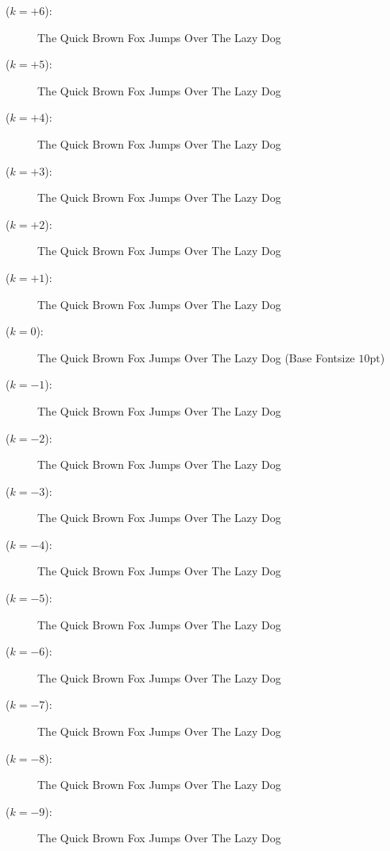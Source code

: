 \documentclass[paper=a4, fontsize=9]{habshe-tufte}
\begin{document}
\begin{description}
\item[\texttt{\string\HUGE} ($k=+6$):] {\HUGE The Quick Brown Fox Jumps Over The Lazy Dog}
\item[\texttt{\string\Huge} ($k=+5$):] {\Huge The Quick Brown Fox Jumps Over The Lazy Dog}
\item[\texttt{\string\huge} ($k=+4$):] {\huge The Quick Brown Fox Jumps Over The Lazy Dog}
\item[\texttt{\string\LARGE} ($k=+3$):] {\LARGE The Quick Brown Fox Jumps Over The Lazy Dog}
\item[\texttt{\string\Large} ($k=+2$):] {\Large The Quick Brown Fox Jumps Over The Lazy Dog}
\item[\texttt{\string\large} ($k=+1$):] {\large The Quick Brown Fox Jumps Over The Lazy Dog}
\item[\texttt{\string\regular} ($k=0$):] {\regular The Quick Brown Fox Jumps Over The Lazy Dog (Base Fontsize $10\text{pt}$)}
\item[\texttt{\string\SMALL} ($k=-1$):] {\SMALL The Quick Brown Fox Jumps Over The Lazy Dog}
\item[\texttt{\string\Small} ($k=-2$):] {\Small The Quick Brown Fox Jumps Over The Lazy Dog}
\item[\texttt{\string\small} ($k=-3$):] {\small The Quick Brown Fox Jumps Over The Lazy Dog}
\item[\texttt{\string\TINY} ($k=-4$):] {\TINY The Quick Brown Fox Jumps Over The Lazy Dog}
\item[\texttt{\string\Tiny} ($k=-5$):] {\Tiny The Quick Brown Fox Jumps Over The Lazy Dog}
\item[\texttt{\string\tiny} ($k=-6$):] {\tiny The Quick Brown Fox Jumps Over The Lazy Dog}
\item[\texttt{\string\MINUSCULE} ($k=-7$):] {\MINUSCULE The Quick Brown Fox Jumps Over The Lazy Dog}
\item[\texttt{\string\Minuscule} ($k=-8$):] {\Minuscule The Quick Brown Fox Jumps Over The Lazy Dog}
\item[\texttt{\string\minuscule} ($k=-9$):] {\minuscule The Quick Brown Fox Jumps Over The Lazy Dog}
\end{description}

\newpage
\setlayouttufte

\subject{Part VI: Global Math Subscript Scaling}
\end{document}
